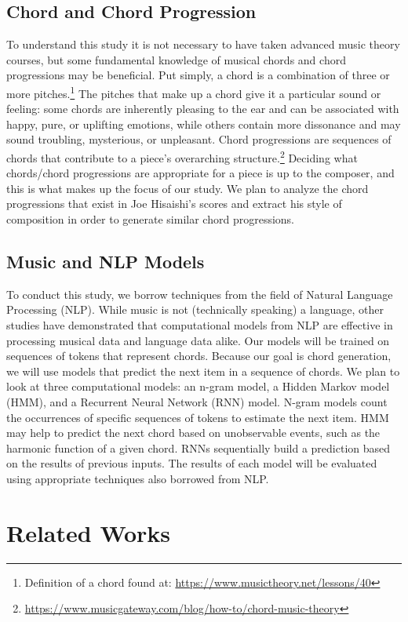 \documentclass[11pt,a4paper]{article}
\begin{document}
\subsection{Chord and Chord Progression}
To understand this study it is not necessary to have taken advanced music theory courses, but some fundamental knowledge of musical chords and chord progressions may be beneficial. Put simply, a chord is a combination of three or more pitches.\footnote{Definition of a chord found at: \url{https://www.musictheory.net/lessons/40}} The pitches that make up a chord give it a particular sound or feeling: some chords are inherently pleasing to the ear and can be associated with happy, pure, or uplifting emotions, while others contain more dissonance and may sound troubling, mysterious, or unpleasant. Chord progressions are sequences of chords that contribute to a piece’s overarching structure.\footnote{\url{https://www.musicgateway.com/blog/how-to/chord-music-theory}} Deciding what chords/chord progressions are appropriate for a piece is up to the composer, and this is what makes up the focus of our study. We plan to analyze the chord progressions that exist in Joe Hisaishi’s scores and extract his style of composition in order to generate similar chord progressions. 
\subsection{Music and NLP Models}
To conduct this study, we borrow techniques from the field of Natural Language Processing (NLP). While music is not (technically speaking) a language, other studies have demonstrated that computational models from NLP are effective in processing musical data and language data alike. Our models will be trained on sequences of tokens that represent chords. Because our goal is chord generation, we will use models that predict the next item in a sequence of chords. We plan to look at three computational models: an n-gram model, a Hidden Markov model (HMM), and a Recurrent Neural Network (RNN) model. N-gram models count the occurrences of specific sequences of tokens to estimate the next item. HMM may help to predict the next chord based on unobservable events, such as the harmonic function of a given chord. RNNs sequentially build a prediction based on the results of previous inputs. The results of each model will be evaluated using appropriate techniques also borrowed from NLP. 


\section{Related Works}
\end{document}

